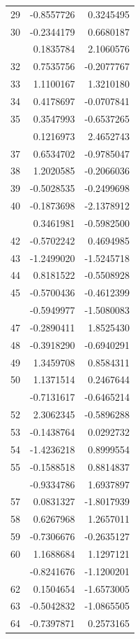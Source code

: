\documentclass[
  japanese,
  letterpaper,
  DIV=11,
  numbers=noendperiod]{scrartcl}
\begin{document}
\begin{longtable}[t]{rrr}
29 & -0.8557726 & 0.3245495\\
30 & -0.2344179 & 0.6680187\\
\addlinespace
31 & 0.1835784 & 2.1060576\\
32 & 0.7535756 & -0.2077767\\
33 & 1.1100167 & 1.3210180\\
34 & 0.4178697 & -0.0707841\\
35 & 0.3547993 & -0.6537265\\
\addlinespace
36 & 0.1216973 & 2.4652743\\
37 & 0.6534702 & -0.9785047\\
38 & 1.2020585 & -0.2066036\\
39 & -0.5028535 & -0.2499698\\
40 & -0.1873698 & -2.1378912\\
\addlinespace
41 & 0.3461981 & -0.5982500\\
42 & -0.5702242 & 0.4694985\\
43 & -1.2499020 & -1.5245718\\
44 & 0.8181522 & -0.5508928\\
45 & -0.5700436 & -0.4612399\\
\addlinespace
46 & -0.5949977 & -1.5080083\\
47 & -0.2890411 & 1.8525430\\
48 & -0.3918290 & -0.6940291\\
49 & 1.3459708 & 0.8584311\\
50 & 1.1371514 & 0.2467644\\
\addlinespace
51 & -0.7131617 & -0.6465214\\
52 & 2.3062345 & -0.5896288\\
53 & -0.1438764 & 0.0292732\\
54 & -1.4236218 & 0.8999554\\
55 & -0.1588518 & 0.8814837\\
\addlinespace
56 & -0.9334786 & 1.6937897\\
57 & 0.0831327 & -1.8017939\\
58 & 0.6267968 & 1.2657011\\
59 & -0.7306676 & -0.2635127\\
60 & 1.1688684 & 1.1297121\\
\addlinespace
61 & -0.8241676 & -1.1200201\\
62 & 0.1504654 & -1.6573005\\
63 & -0.5042832 & -1.0865505\\
64 & -0.7397871 & 0.2573165\\

\end{longtable}
\end{document}
